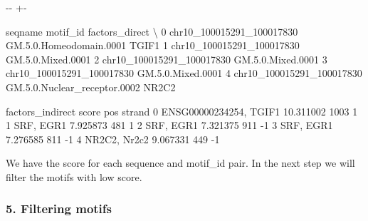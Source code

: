 \documentclass[letterpaper,10pt,english]{sphinxmanual}
\newlength\nbsphinxcodecellspacing
\begin{document}
{

\kern-\sphinxverbatimsmallskipamount\kern-\baselineskip
\kern+\FrameHeightAdjust\kern-\fboxrule
\vspace{\nbsphinxcodecellspacing}

\begin{sphinxVerbatim}[commandchars=\\\{\}]
\llap{\color{nbsphinxout}[16]:\,\hspace{\fboxrule}\hspace{\fboxsep}}                     seqname                      motif\_id factors\_direct  \textbackslash{}
0  chr10\_100015291\_100017830       GM.5.0.Homeodomain.0001          TGIF1
1  chr10\_100015291\_100017830             GM.5.0.Mixed.0001
2  chr10\_100015291\_100017830             GM.5.0.Mixed.0001
3  chr10\_100015291\_100017830             GM.5.0.Mixed.0001
4  chr10\_100015291\_100017830  GM.5.0.Nuclear\_receptor.0002          NR2C2

         factors\_indirect      score   pos  strand
0  ENSG00000234254, TGIF1  10.311002  1003       1
1               SRF, EGR1   7.925873   481       1
2               SRF, EGR1   7.321375   911      -1
3               SRF, EGR1   7.276585   811      -1
4            NR2C2, Nr2c2   9.067331   449      -1
\end{sphinxVerbatim}
}

We have the score for each sequence and motif\_id pair. In the next step we will filter the motifs with low score.


\subsubsection{5. Filtering motifs}
\label{\detokenize{notebooks/02_motif_scan/02_atac_peaks_to_TFinfo_with_celloracle_190901:5.-Filtering-motifs}}
{
\begin{sphinxVerbatim}[commandchars=\\\{\}]
\llap{\color{nbsphinxin}[17]:\,\hspace{\fboxrule}\hspace{\fboxsep}}


\end{sphinxVerbatim}
}
\end{document}
